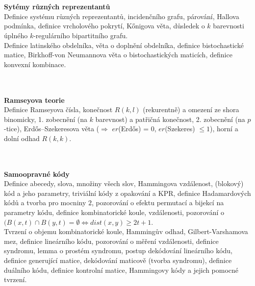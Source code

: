 \documentclass[a4paper]{article}
\newcommand{\hlava}[1]{\text{} \\ \text{} \\ \text{} \hspace{-0.27cm} \textbf{#1} \\}
\newcommand{\str}[1]{\hspace{0.05cm} \fbox{s. #1} }
\begin{document}
\hlava{Sytémy různých reprezentantů}
Definice systému různých reprezentantů, incidenčního grafu, párování, Hallova podmínka, definice vrcholového pokrytí, Kőnigova věta, důsledek o $k$ barevnosti úplného $k$-regulárního bipartitního grafu. \\
Definice latinského obdelníka, věta o doplnění obdelníka, definice bistochastické matice, Birkhoff-von Neumannova věta o bistochastických maticích, definice konvexní kombinace. \str{23}

\hlava{Ramseyova teorie}
Definice Ramseyova čísla, konečnost $R(k,l)$ (rekurentně) a omezení ze shora binomicky, 1. zobecnění (na $k$ barevnost) a patřičná konečnost, 2. zobecnění (na $p$-tice), Erdős–Szekeresova věta ($\Rightarrow$ $er$(Erdős) = 0, $er$(Szekeres) $\le 1$), horní a dolní odhad $R(k,k)$.
\str{26}

\hlava{Samoopravné kódy}
Definice abecedy, slova, množiny všech slov, Hammingova vzdálenost, (blokový) kód a jeho parametry, triviální kódy z opakování a KPR, definice Hadamardových kódů a tvorba pro mocniny $2$, pozorování o efektu permutací a bijekcí na parametry kódu, definice kombinatorické koule, vzdálenosti, pozorování o $(B(x,t) \cap B(y,t) = \emptyset \Leftrightarrow dist(x,y) \ge 2t+1$. \\
Tvrzení o objemu kombinatorické koule, Hammingův odhad, Gilbert-Varshamova mez, definice lineárního kódu, pozorování o měření vzdálenosti, definice syndromu, lemma o prostém syndromu, postup dekódování lineárního kódu, definice generující matice, dekódování maticově (tvorba syndromu), definice duálního kódu, definice kontrolní matice, Hammingovy kódy a jejich pomocné tvrzení. \str{29}
\end{document}
